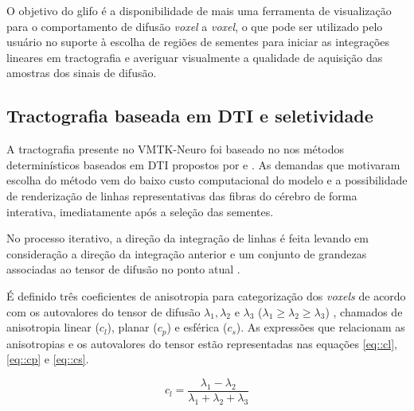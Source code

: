 \documentclass[
    12pt,                %
    oneside,            %
    a4paper,            %
    english,            %
    french,                %
    spanish,            %
    brazil                %
    ]{abntex2}
\begin{document}
O objetivo do glifo é a disponibilidade de mais uma ferramenta de visualização para o comportamento de difusão \textit{voxel} a \textit{voxel}, o que pode ser utilizado pelo usuário no suporte à escolha de regiões de sementes para iniciar as integrações lineares em tractografia e averiguar visualmente a qualidade de aquisição das amostras dos sinais de difusão.


\subsection{Tractografia baseada em DTI e seletividade}
\label{ssec::tractografia_e_seletividade}





A tractografia presente no VMTK-Neuro foi baseado no nos métodos determinísticos baseados em DTI propostos por  e . As demandas que motivaram escolha do método vem do baixo custo computacional do modelo e a possibilidade de renderização de linhas representativas das fibras do cérebro de forma interativa, imediatamente após a seleção das sementes.



No processo iterativo, a direção da integração de linhas é feita levando em consideração a direção da integração anterior e um conjunto de grandezas associadas ao tensor de difusão no ponto atual \cite{Weinstein1999}.


É definido três coeficientes de anisotropia para categorização dos \textit{voxels} de acordo com os autovalores do tensor de difusão $\lambda_1, \lambda_2$ e $\lambda_3$ ($\lambda_1 \geq \lambda_2 \geq \lambda_3$) , chamados de anisotropia linear ($c_l$), planar ($c_p$) e esférica ($c_s$). As expressões que relacionam as anisotropias e os autovalores do tensor estão representadas nas equações \ref{eq::cl}, \ref{eq::cp} e \ref{eq::cs}.

\begin{equation}
\label{eq::cl}
    c_l = \frac{\lambda_1 - \lambda_2}{\lambda_1 + \lambda_2 + \lambda_3}
\end{equation}
\end{document}
